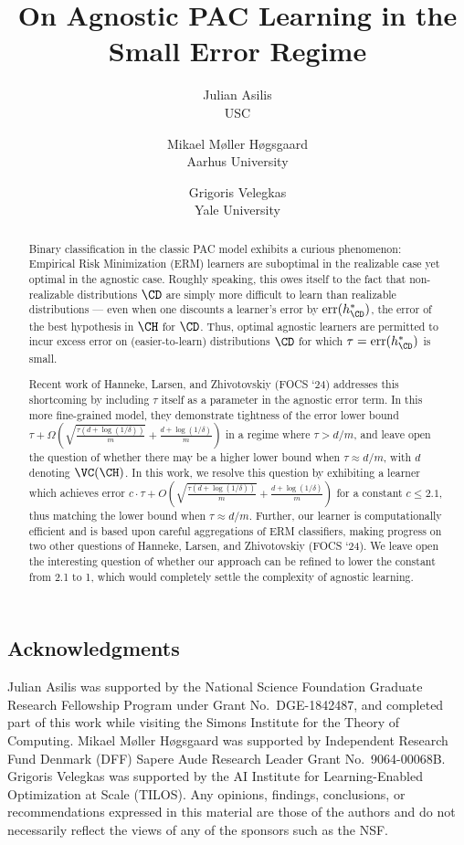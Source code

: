 \documentclass[11pt]{article}
\title{On Agnostic PAC Learning in the Small Error Regime}
\author{Julian Asilis \\ USC \\ \email{asilis@usc.edu} \and 
Mikael {M\o ller H\o gsgaard} \\ Aarhus University  \\ \email{hogsgaard@cs.au.dk} \and 
Grigoris Velegkas \\ Yale University \\ \email{grigoris.velegkas@yale.edu} 
}
\date{}
\begin{document}
\maketitle

\begin{abstract}
Binary classification in the classic PAC model exhibits a curious phenomenon: Empirical Risk Minimization (ERM) learners are suboptimal in the realizable case yet optimal in the agnostic case. Roughly speaking, this owes itself to the fact that non-realizable distributions $\CD$ are simply more difficult to learn than realizable distributions --- even when one discounts a learner's error by $\mathrm{err}(h^*_\CD)$, the error of the best hypothesis in $\CH$ for $\CD$. Thus, optimal agnostic learners are permitted to incur excess error on (easier-to-learn) distributions $\CD$ for which $\tau = \mathrm{err}(h^*_\CD)$ is small.

Recent work of Hanneke, Larsen, and Zhivotovskiy (FOCS `24) addresses this shortcoming by including $\tau$ itself as a parameter in the agnostic error term. {In this more fine-grained model, they demonstrate tightness of the  error lower bound $\tau + \Omega \left(\sqrt{\frac{\tau (d + \log(1 / \delta))}{m}} + \frac{d + \log(1 / \delta)}{m} \right)$ in a regime where $\tau > d/m$, and leave open the question of whether there may be a higher lower bound when $\tau \approx d/m$, with $d$ denoting $\VC(\CH)$.}
In this work, we resolve this question by exhibiting a learner which achieves error $c \cdot \tau + O \left(\sqrt{\frac{\tau (d + \log(1 / \delta))}{m}} + \frac{d + \log(1 / \delta)}{m} \right)$ for a constant $c \leq 2.1$, thus matching the lower bound when $\tau \approx d/m$. Further, our learner is computationally efficient and is based upon careful aggregations of ERM classifiers, making progress on two other questions of Hanneke, Larsen, and Zhivotovskiy (FOCS `24). We leave open the interesting question of whether our approach can be refined to lower the constant from 2.1 to 1, which would completely settle the complexity of agnostic learning.
\end{abstract}

\newpage 
\begingroup
  \hypersetup{hidelinks}
  \tableofcontents
\endgroup
\newpage 





\subsection*{Acknowledgments}
\noindent
Julian Asilis was supported by the National Science Foundation Graduate Research Fellowship Program under Grant No.\ DGE-1842487, and completed part of this work while visiting the Simons Institute for the Theory of Computing. 
Mikael Møller Høgsgaard was supported by Independent
Research Fund Denmark (DFF) Sapere Aude Research Leader Grant No.\ 9064-00068B.
Grigoris Velegkas was
supported by the AI Institute for Learning-Enabled Optimization at Scale (TILOS).
Any opinions, findings, conclusions, or recommendations expressed in this material are those of the authors and do not necessarily reflect the views of any of the sponsors such as the NSF.

\newpage 


\newpage 


\end{document}
